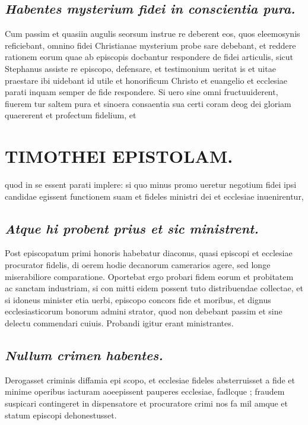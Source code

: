 \documentclass{article}
\begin{document}
\begin{pages}
\subsection*{\textit{Habentes mysterium fidei in conscientia pura. }}\pstart Cum passim et quasiin augulis seorsum instrue re deberent eos, quos eleemosynis reficiebant, omnino fidei Christianae mysterium probe sare debebant, et reddere rationem eorum quae ab episcopis docbantur respondere de fidei articulis, sicut Stephanus assiste re episcopo, defensare, et testimonium ueritat is et uitae praestare ibi uidebant id utile et honorificum Christo et euangelio et ecclesiae parati inquam semper de fide respondere. Si uero sine omni fructuuiderent, fiuerem tur saltem pura et sinoera consaentia sua certi coram deog dei gloriam quaererent et profectum fidelium, et  \pend
\section*{TIMOTHEI EPISTOLAM. }
\marginpar{[ p.83 ]}\pstart quod in se essent parati implere: si quo minus promo ueretur negotium fidei ipsi candidae egissent functionem suam et fideles ministri dei et ecclesiae inuenirentur,  \pend
{}
{}
\subsection*{\textit{Atque hi probent prius et sic ministrent. }}\pstart Post episcopatum primi honoris habebatur diaconus, quasi episcopi et ecclesiae procurator fidelis, di oerem hodie decanorum camerarios agere, sed longe miserabiliore comparatione. Oportebat ergo probari fidem eorum et probitatem ac sanctam industriam, si con mitti eidem possent tuto distribuendae collectae, et si idoneus minister etia uerbi, episcopo concors fide et moribus, et dignus ecclesiasticorum bonorum admini strator, quod non debebant passim et sine delectu commendari cuiuis. Probandi igitur erant ministrantes.  \pend
{}
{}
\subsection*{\textit{Nullum crimen habentes. }}\pstart Derogasset criminis diffamia epi scopo, et ecclesiae fideles absterruisset a fide et minime operibus iacturam aoeepissent pauperes ecclesiae, fadlcque ; fraudem suspicari contingeret in dispensatore et procuratore crimi nos fa mil amque et statum episcopi dehonestusset.  \pend
{}
{}

\end{pages}
\end{document}

